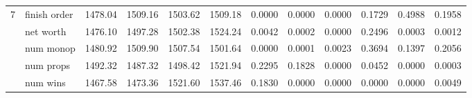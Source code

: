 \begin{landscape}
\begin{table}[ht]
\begin{tabularx}{\linewidth}{|p{1in}|p{1in}|r|r|r|r|r|r|r|r|r|r|}
      \cline{1-12}
      \multirow{5}{*}{7} & finish order & 1478.04 & 1509.16 & 1503.62 & 1509.18 & 0.0000 & 0.0000 & 0.0000 & 0.1729 & 0.4988 & 0.1958 \\
\cline{2-12}             & net worth & 1476.10 & 1497.28 & 1502.38 & 1524.24 & 0.0042 & 0.0002 & 0.0000 & 0.2496 & 0.0003 & 0.0012 \\
\cline{2-12}             & num monop & 1480.92 & 1509.90 & 1507.54 & 1501.64 & 0.0000 & 0.0001 & 0.0023 & 0.3694 & 0.1397 & 0.2056 \\
\cline{2-12}             & num props & 1492.32 & 1487.32 & 1498.42 & 1521.94 & 0.2295 & 0.1828 & 0.0000 & 0.0452 & 0.0000 & 0.0003 \\
\cline{2-12}             & num wins & 1467.58 & 1473.36 & 1521.60 & 1537.46 & 0.1830 & 0.0000 & 0.0000 & 0.0000 & 0.0000 & 0.0049 \\

      \cline{1-12}
    \end{tabularx}%
  \label{tab:intrapop1024_finorder}%
\end{table}%

\end{landscape}